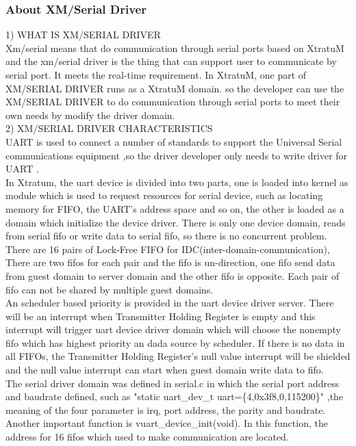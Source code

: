 \subsubsection{About XM/Serial Driver }
1)  WHAT IS XM/SERIAL DRIVER
\\
Xm/serial means that do communication through serial ports based on XtratuM and the xm/serial driver is the thing that can support user to communicate by serial port. It meets the real-time requirement. In XtratuM, one part of XM/SERIAL DRIVER runs as a XtratuM domain. so the developer can use the XM/SERIAL DRIVER to do communication through serial ports to meet their own needs by modify the driver domain.
\\
2)  XM/SERIAL DRIVER CHARACTERISTICS
\\
UART is used to connect a number of standards to support the Universal Serial communications equipment ,so the driver developer only needs to write driver for UART .
\\
	In Xtratum, the uart device is divided into two parts, one is loaded into kernel as module which is used to request resources for serial device, such as locating memory for FIFO, the UART's address space and so on, the other is loaded as a domain which initialize the device driver. There is only one device domain, reads from serial fifo or write data to serial fifo, so there is no concurrent problem.
\\
	There are 16 pairs of Lock-Free FIFO for IDC(inter-domain-communication), There are two fifos for each pair and the fifo is un-direction, one fifo send data from guest domain to server domain and the other fifo is opposite. Each pair of fifo can not be shared by multiple guest domains.
\\
	An scheduler based priority is provided in the uart device driver server. There will be an interrupt when Transmitter Holding Register is empty and this interrupt will trigger uart device driver domain which will choose the nonempty fifo which has highest priority an dada source by scheduler. If there is no data in all FIFOs, the Transmitter Holding Register's null value interrupt will be shielded and the null value interrupt can start when guest domain write data to fifo.
\\
	The serial driver domain was defined in serial.c in which the serial port address and baudrate defined, such as 
"static uart\_dev\_t uart=\{4,0x3f8,0,115200\}" ,the meaning of the four parameter is irq, port address, the parity and baudrate. Another important function is vuart\_device\_init(void). In this function, the address for 16 fifos which used to make communication are located.
